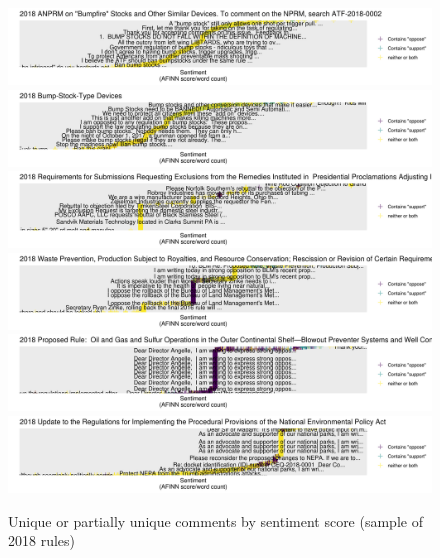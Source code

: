 \documentclass{article}
\begin{document}
\begin{figure}
    \caption{Unique or partially unique comments by sentiment score (sample of 2018 rules)}
    \label{fig:sentiment-2018}
    \centering
    \includegraphics[width = 7in]{Figs/sent-2018ATF-2018-0001.png}
    \includegraphics[width = 7in]{Figs/sent-2018ATF-2018-0002.png}
    \includegraphics[width = 7in]{Figs/sent-2018BIS-2018-0006.png}
    \includegraphics[width = 7in]{Figs/sent-2018BLM-2018-0001.png}
    \includegraphics[width = 7in]{Figs/sent-2018BSEE-2018-0002.png}
    \includegraphics[width = 7in]{Figs/sent-2018CEQ-2018-0001.png}
\end{figure}
\end{document}
